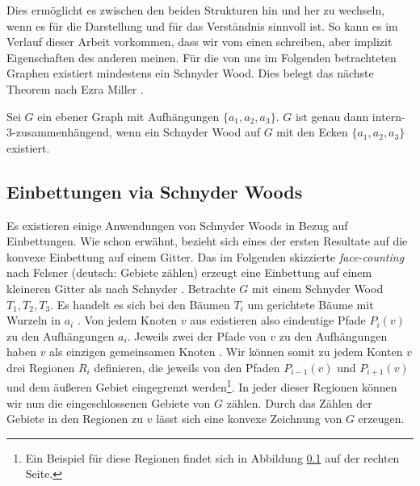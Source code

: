 Dies ermöglicht es zwischen den beiden Strukturen hin und her zu wechseln, wenn es für die Darstellung und für das Verständnis sinnvoll ist. So kann es im Verlauf dieser Arbeit vorkommen, dass wir vom einen schreiben, aber implizit Eigenschaften des anderen meinen. Für die von uns im Folgenden betrachteten Graphen existiert mindestens ein Schnyder Wood. Dies belegt das nächste Theorem nach Ezra Miller \cite[Theorem A]{miller02}.

\begin{theorem}
Sei $G$ ein ebener Graph mit Aufhängungen $\{a_1,a_2,a_3\}$. $G$ ist genau dann intern-3-zusammenhängend, wenn ein Schnyder Wood auf $G$ mit den Ecken $\{a_1,a_2,a_3\}$ existiert.
\end{theorem}

\subsection{Einbettungen via Schnyder Woods}\label{face_counting}

Es existieren einige Anwendungen von Schnyder Woods in Bezug auf Einbettungen. Wie schon erwähnt, bezieht sich eines der ersten Resultate auf die konvexe Einbettung auf einem Gitter. Das im Folgenden skizzierte \textit{face-counting} nach Felsner (deutsch: Gebiete zählen) erzeugt eine Einbettung auf einem kleineren Gitter als nach Schnyder \cite{felsner01}. Betrachte $G$ mit einem Schnyder Wood $T_1,T_2,T_3$. Es handelt es sich bei den Bäumen $T_i$ um gerichtete Bäume mit Wurzeln in $a_i$ \cite[Korollar 2.5]{felsner12}. Von jedem Knoten $v$ aus existieren also eindeutige Pfade $P_i(v)$ zu den Aufhängungen $a_i$. Jeweils zwei der Pfade von $v$ zu den Aufhängungen haben $v$ als einzigen gemeinsamen Knoten \cite[Lemma 2.4]{felsner12}. Wir können somit zu jedem Konten $v$ drei Regionen $R_i$ definieren, die jeweils von den Pfaden $P_{i-1}(v)$ und $P_{i+1}(v)$ und dem äußeren Gebiet eingegrenzt werden\footnote{Ein Beispiel für diese Regionen findet sich in Abbildung \ref{face_counting} auf der rechten Seite.}. In jeder dieser Regionen können wir nun die eingeschlossenen Gebiete von $G$ zählen. Durch das Zählen der Gebiete in den Regionen zu $v$ lässt sich eine konvexe Zeichnung von $G$ erzeugen.

